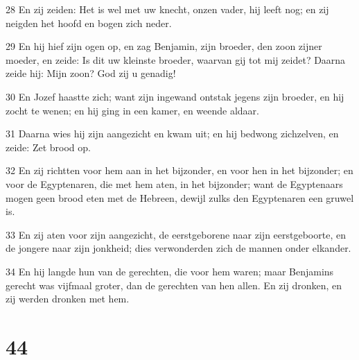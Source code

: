 \par 28 En zij zeiden: Het is wel met uw knecht, onzen vader, hij leeft nog; en zij neigden het hoofd en bogen zich neder.
\par 29 En hij hief zijn ogen op, en zag Benjamin, zijn broeder, den zoon zijner moeder, en zeide: Is dit uw kleinste broeder, waarvan gij tot mij zeidet? Daarna zeide hij: Mijn zoon? God zij u genadig!
\par 30 En Jozef haastte zich; want zijn ingewand ontstak jegens zijn broeder, en hij zocht te wenen; en hij ging in een kamer, en weende aldaar.
\par 31 Daarna wies hij zijn aangezicht en kwam uit; en hij bedwong zichzelven, en zeide: Zet brood op.
\par 32 En zij richtten voor hem aan in het bijzonder, en voor hen in het bijzonder; en voor de Egyptenaren, die met hem aten, in het bijzonder; want de Egyptenaars mogen geen brood eten met de Hebreen, dewijl zulks den Egyptenaren een gruwel is.
\par 33 En zij aten voor zijn aangezicht, de eerstgeborene naar zijn eerstgeboorte, en de jongere naar zijn jonkheid; dies verwonderden zich de mannen onder elkander.
\par 34 En hij langde hun van de gerechten, die voor hem waren; maar Benjamins gerecht was vijfmaal groter, dan de gerechten van hen allen. En zij dronken, en zij werden dronken met hem.

\chapter{44}

